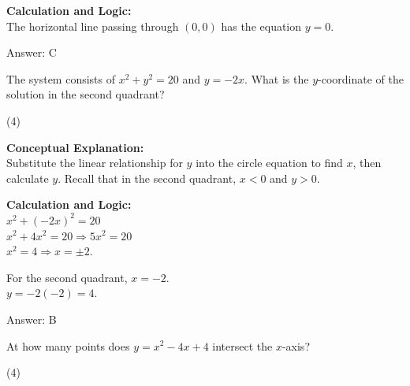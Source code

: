\documentclass[11pt,paper=a4,answers]{exam}
\begin{document}
\begin{questions}
\begin{solution}
\vspace{20pt}

\textbf{Calculation and Logic:} \\
The horizontal line passing through $(0, 0)$ has the equation $y = 0$.

\vspace{25pt}

Answer: \colorbox{yellow!100}{C}
\end{solution}

\vspace{40pt}

\question

The system consists of $x^2 + y^2 = 20$ and $y = -2x$. What is the $y$-coordinate of the solution in the second quadrant?
\begin{tasks}(4)
\end{tasks}

\begin{solution}
\textbf{Conceptual Explanation:} \\
Substitute the linear relationship for $y$ into the circle equation to find $x$, then calculate $y$. Recall that in the second quadrant, $x < 0$ and $y > 0$.

\vspace{20pt}

\textbf{Calculation and Logic:} \\
$x^2 + (-2x)^2 = 20$ \\
$x^2 + 4x^2 = 20 \Rightarrow 5x^2 = 20$ \\
$x^2 = 4 \Rightarrow x = \pm 2$.

\vspace{10pt}

For the second quadrant, $x = -2$. \\
$y = -2(-2) = 4$.

\vspace{25pt}

Answer: \colorbox{yellow!100}{B}
\end{solution}

\vspace{40pt}

\question
At how many points does $y = x^2 - 4x + 4$ intersect the $x$-axis?
\begin{tasks}(4)
\end{tasks}


\end{questions}
\end{document}
